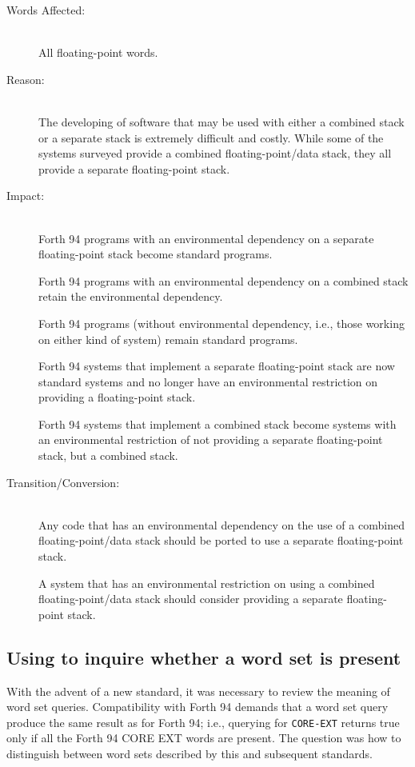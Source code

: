 \begin{description}
\item[Words Affected:] ~\\
	All floating-point words.

\item[Reason:] ~\\
	The developing of software that may be used with either a combined
	stack or a separate stack is extremely difficult and costly.  While
	some of the systems surveyed provide a combined floating-point/data
	stack, they all provide a separate floating-point stack.

\item[Impact:] ~\\
	Forth 94 programs with an environmental dependency on a separate
	floating-point stack become standard programs.

	Forth 94 programs with an environmental dependency on a combined
	stack retain the environmental dependency.

	Forth 94 programs (without environmental dependency, i.e., those
	working on either kind of system) remain standard programs.

	Forth 94 systems that implement a separate floating-point stack
	are now standard systems and no longer have an environmental
	restriction on providing a floating-point stack.

	Forth 94 systems that implement a combined stack become systems
	with an environmental restriction of not providing a separate
	floating-point stack, but a combined stack.

\item[Transition/Conversion:] ~\\
	Any code that has an environmental dependency on the use of a
	combined floating-point/data stack should be ported to use a
	separate floating-point stack.

	A system that has an environmental restriction on using a combined
	floating-point/data stack should consider providing a separate
	floating-point stack.
\end{description}


\subsection[Using ENVIRONMENT? to inquire whether a word set is present]{Using  to inquire whether a word set is present} %
\label{diff:environment}

With the advent of a new standard, it was necessary to review the
meaning of word set queries.  Compatibility with Forth 94 demands
that a word set query produce the same result as for Forth 94; i.e.,
querying for \texttt{CORE-EXT} returns true only if all the Forth 94
CORE EXT words are present.  The question was how to distinguish
between word sets described by this and subsequent standards.


